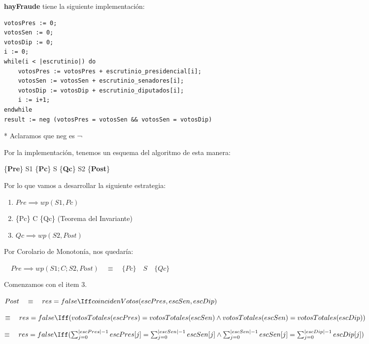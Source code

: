 \documentclass[10pt,a4paper]{article}
\begin{document}
\textbf{hayFraude} tiene la siguiente implementación:

\begin{lstlisting}
votosPres := 0;
votosSen := 0;
votosDip := 0;
i := 0;
while(i < |escrutinio|) do 
    votosPres := votosPres + escrutinio_presidencial[i];
    votosSen := votosSen + escrutinio_senadores[i];
    votosDip := votosDip + escrutinio_diputados[i];
    i := i+1;
endwhile
result := neg (votosPres = votosSen && votosSen = votosDip)
\end{lstlisting}
\vspace{0.2cm}
    * Aclaramos que neg es ¬

\vspace{0.3cm}

Por la implementación, tenemos un esquema del algoritmo de esta manera:

\vspace{0.3cm}
    \{\textbf{Pre}\}  S1  \{\textbf{Pc}\}  S  \{\textbf{Qc}\}  S2  \{\textbf{Post}\}

\vspace{0.3cm}
    Por lo que vamos a desarrollar la siguiente estrategia:

\vspace{0.3cm}
    \begin{enumerate}
    	\item $Pre \implies wp(S1, Pc)$
    	\item {\{Pc\}}  C  {\{Qc\}}    (Teorema del Invariante)
    	\item $Qc \implies  wp(S2, Post)$
    \end{enumerate}

\vspace{0.3cm}
    Por Corolario de Monotonía, nos quedaría:

	\vspace{0.3cm}
	$\quad Pre \implies wp(S1; C; S2, Post) \quad \equiv \quad {\{Pc\}}  \quad S \quad {\{Qc\}}$

\vspace{0.3cm}
    Comenzamos con el item 3.

\vspace{0.3cm}
   $Post \quad \equiv \quad res = false \Iff coincidenVotos(escPres, escSen, escDip)$

\vspace{0.2cm}
    $\equiv \quad res = false \Iff (votosTotales(escPres) = votosTotales(escSen)  \wedge votosTotales(escSen) = votosTotales(escDip))$

\vspace{0.2cm}
    $\equiv \quad res = false \Iff ( \sum_{j=0}^{|escPres| - 1} escPres[j] = \sum_{j=0}^{|escSen| - 1} escSen[j] \wedge \sum_{j=0}^{|escSen| - 1} escSen[j] = \sum_{j=0}^{|escDip| - 1} escDip[j] )$
\end{document}
